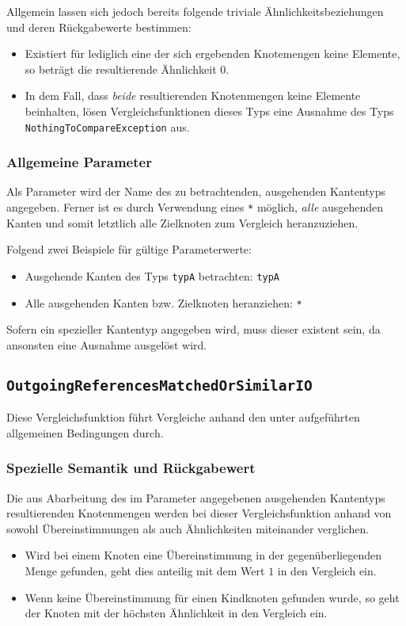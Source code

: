 Allgemein lassen sich jedoch bereits folgende triviale Ähnlichkeitsbeziehungen und deren Rückgabewerte bestimmen:
\begin{itemize}
	\item Existiert für lediglich eine der sich ergebenden Knotemengen keine Elemente, so beträgt die resultierende Ähnlichkeit $0$.
	\item In dem Fall, dass \emph{beide} resultierenden Knotenmengen keine Elemente beinhalten, lösen Vergleichsfunktionen dieses Typs eine Ausnahme des Typs \texttt{NothingToCompareException} aus.
\end{itemize}

\subsubsection*{Allgemeine Parameter}
Als Parameter wird der Name des zu betrachtenden, ausgehenden Kantentyps angegeben. Ferner ist es durch Verwendung eines \texttt{*} möglich, \emph{alle} ausgehenden Kanten und somit letztlich alle Zielknoten zum Vergleich heranzuziehen.

Folgend zwei Beispiele für gültige Parameterwerte:
\begin{itemize}
	\item Ausgehende Kanten des Typs \texttt{typA} betrachten:  \texttt{typA}
	\item Alle ausgehenden Kanten bzw. Zielknoten heranziehen:  \texttt{*}
\end{itemize}

 Sofern ein spezieller Kantentyp angegeben wird, muss dieser existent sein, da ansonsten eine Ausnahme ausgelöst wird.

\newpage
%
%
\subsection{\texttt{OutgoingReferencesMatchedOrSimilarIO}}
Diese Vergleichsfunktion führt Vergleiche anhand den unter\mylinebreak{} aufgeführten allgemeinen Bedingungen durch.

\subsubsection*{Spezielle Semantik und Rückgabewert}
Die aus Abarbeitung des im Parameter angegebenen ausgehenden Kantentyps resultierenden Knotenmengen werden bei dieser Vergleichsfunktion anhand von sowohl Übereinstimmungen als auch Ähnlichkeiten miteinander verglichen.
\begin{itemize}
	\item Wird bei einem Knoten eine Übereinstimmung in der gegenüberliegenden Menge gefunden, geht dies anteilig mit dem Wert $1$ in den Vergleich ein.
	\item Wenn keine Übereinstimmung für einen Kindknoten gefunden wurde, so geht der Knoten mit der höchsten Ähnlichkeit in den Vergleich ein.
\end{itemize}

